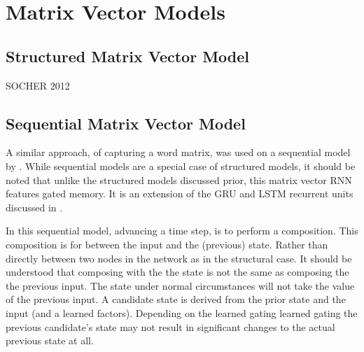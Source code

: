\documentclass[12pt,parskip]{komatufte}
\begin{document}




\section{Matrix Vector Models}
\subsection{Structured Matrix Vector Model}
SOCHER 2012

\subsection{Sequential Matrix Vector Model}
A similar approach, of capturing a word matrix, 
was used on a sequential model by .
While sequential models are a special case of structured models,
it should be noted that unlike the structured models discussed prior,
this matrix vector RNN features gated memory.
It is an extension of the GRU and LSTM recurrent units discussed in .

In this sequential model, advancing a time step, is to perform a composition.
This composition is for between the input and the (previous) state.
Rather than directly between two nodes in the network as in the structural case.
It should be understood that composing with the the state is not the same as composing the the previous input.
The state under normal circumstances will not take the value of the previous input.
A candidate state is derived from the prior state and the input (and a learned factors).
Depending on the learned gating learned gating the previous candidate's state may not result in significant changes to the actual previous state at all.
\end{document}
